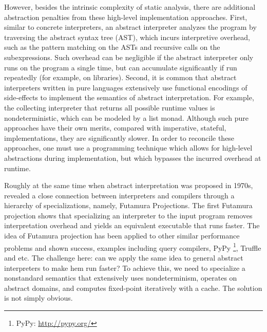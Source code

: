 However, besides the intrinsic complexity of static analysis, there are
additional abstraction penalties from these high-level implementation
approaches. First, similar to concrete interpreters, an abstract interpreter
analyzes the program by traversing the abstract syntax tree (AST), which incurs
interpretive overhead, such as the pattern matching on the ASTs and recursive
calls on the subexpressions. Such overhead can be negligible if the abstract
interpreter only runs on the program a single time, but can accumulate
significantly if run repeatedly (for example, on libraries).  Second, it is
common that abstract interpreters written in pure languages extensively use
functional encodings of side-effects to implement the semantics of abstract interpretation. 
For example, the collecting interpreter that returns all possible runtime values is
nondeterministic, which can be modeled by a list monad.  Although such pure
approaches have their own merits, compared with imperative, stateful,
implementations, they are significantly slower.
In order to reconcile these approaches, one must use a programming technique
which allows for high-level abstractions during implementation, but which
bypasses the incurred overhead at runtime.

Roughly at the same time when abstract interpretation was proposed in
1970s, \citet{futamura1971partial, Futamura1999} revealed a close
connection between interpreters and compilers through a hierarchy of
specializations, namely, Futamura Projections. The first Futamura
projection shows that specializing an interpreter to the input program
removes interpretation overhead and yields an equivalent executable
that runs faster. The idea of Futamura projection has been applied to 
other similar performance problems and shown success, examples including
query compilers\cite{DBLP:conf/sigmod/TahboubER18}, PyPy \footnote{PyPy:
\url{http://pypy.org/}}, Truffle \cite{Marr:2015:TVP:2814270.2814275} and etc.
The challenge here: can we apply the same idea to general abstract interpreters
to make hem run faster? To achieve this, we need to specialize a nonstandard
semantics that extensively uses nondeterminism, operates on abstract domains,
and computes fixed-point iteratively with a cache. The solution is not simply obvious.

